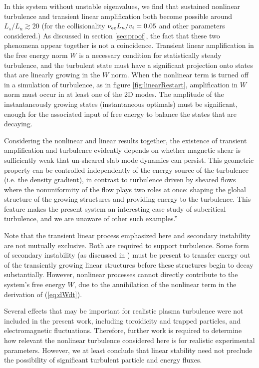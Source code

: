 \documentclass{jpp}
\begin{document}
In this system without unstable eigenvalues, we find that sustained nonlinear turbulence
and transient linear amplification both become possible around $L_s / L_n \gtrsim 20$
(for the collisionality $\nu_{ee} L_n / v_i = 0.05$ and other parameters considered.)
As discussed in section \ref{sec:proof}, the fact that these two phenomena appear together is not
a coincidence. Transient linear amplification in the free energy norm $W$ is a necessary condition for statistically steady
turbulence, and the turbulent state must have a significant projection onto states that are linearly growing in the $W$
norm.  When the nonlinear term is turned off in a simulation of turbulence, as in figure \ref{fig:linearRestart},
amplification in $W$ norm must occur in at least one of the 2D modes.
The amplitude of the instantaneously growing states (instantaneous optimals) must be
significant, enough for the associated input of free energy to balance
the states that are decaying.

Considering the nonlinear and linear results together, the existence of transient amplification and
turbulence evidently depends on whether magnetic shear is sufficiently weak that un-sheared slab mode
dynamics can persist.
This geometric property can be controlled independently of the energy source of the turbulence (i.e. the density gradient),
in contrast to turbulence driven by sheared flows where the nonuniformity of the flow plays two roles at once:
shaping the global structure of the growing structures and providing energy to the turbulence.
This feature makes the present system an interesting case study of subcritical turbulence, and we are unaware of other such examples.”

Note that the transient linear process emphasized here and secondary instability are not mutually
exclusive. Both are required to support turbulence.
Some form of secondary instability (as discussed in \citet{Drake}) must be present to transfer energy out of the transiently growing linear
structures before these structures begin to decay substantially. However, nonlinear processes cannot
directly contribute to the system's free energy $W$, due to the annihilation of the nonlinear term
in the derivation of (\ref{eq:dWdt}).

Several effects that may be important for realistic plasma turbulence
were not included in the present work, including toroidicity and trapped particles,
and electromagnetic fluctuations.
Therefore, further work is required to determine how relevant the nonlinear turbulence considered here
is for realistic experimental parameters.  However, we at least conclude that linear stability
need not preclude the possibility of significant turbulent particle and energy fluxes.
\end{document}
